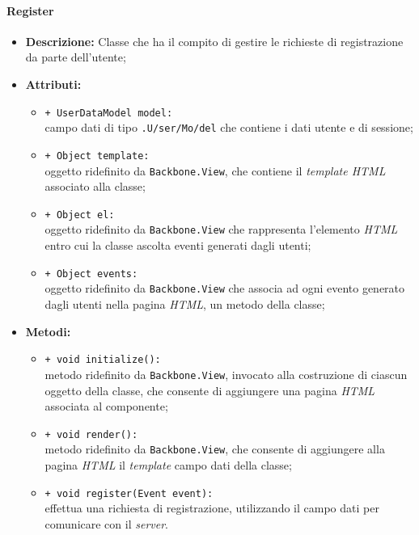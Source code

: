 \paragraph{Register}
\begin{flushleft}
\begin{itemize}
\item \textbf{Descrizione:} Classe che ha il compito di gestire le richieste di registrazione da parte dell'utente;
\item \textbf{Attributi:}
\begin{sloppypar}
\begin{itemize}
\item \texttt{+ UserDataModel model:}\\ campo dati di tipo \texttt{\model{}.U\fshyp{}ser\fshyp{}Mo\fshyp{}del} che contiene i dati utente e di sessione;
\item \texttt{+ Object template:}\\ oggetto ridefinito da \texttt{Backbone.View}, che contiene il \textit{template HTML} associato alla classe;
\item \texttt{+ Object el:}\\ oggetto ridefinito da \texttt{Backbone.View} che rappresenta l'elemento \textit{HTML} entro cui la classe ascolta eventi generati dagli utenti;
\item \texttt{+ Object events:}\\ oggetto ridefinito da \texttt{Backbone.View} che associa ad ogni evento generato dagli utenti nella pagina \textit{HTML}, un metodo della classe;
\end{itemize}
\end{sloppypar}
\item \textbf{Metodi:}
\begin{sloppypar}
\begin{itemize}
\item \texttt{+ void initialize():}\\ metodo ridefinito da \texttt{Backbone.View}, invocato alla costruzione di ciascun oggetto della classe, che consente di aggiungere una pagina \textit{HTML} associata al componente;
\item \texttt{+ void render():}\\ metodo ridefinito da \texttt{Backbone.View}, che consente di aggiungere alla pagina \textit{HTML} il \textit{template} campo dati della classe;
\item \texttt{+ void register(Event event):}\\ effettua una richiesta di registrazione, utilizzando il campo dati \model{} per comunicare con il \textit{server}.
\end{itemize}
\end{sloppypar}
\end{itemize}
\end{flushleft}

